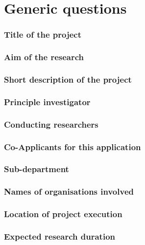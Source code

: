\documentclass[a4paper]{article}
\begin{document}
\section{Generic questions}

\subsubsection{Title of the project}

\subsubsection{Aim of the research}

\subsubsection{Short description of the project}

\subsubsection{Principle investigator}

\subsubsection{Conducting researchers}

\subsubsection{Co-Applicants for this application}

\subsubsection{Sub-department}

\subsubsection{Names of organisations involved}

\subsubsection{Location of project execution}

\subsubsection{Expected research duration}
\end{document}
